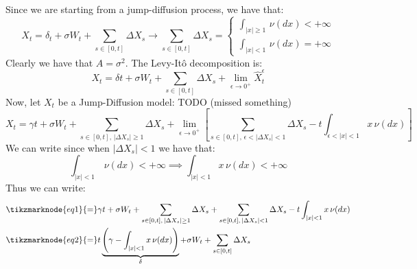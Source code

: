 \begin{example}
Since we are starting from a jump-diffusion process, we have that:
\[
    X_t = \delta_t + \sigma W_t + \sum_{s\in[0,t]} \Delta X_s \longrightarrow
   \sum_{s\in[0,t]} \Delta X_s = \left\{\begin{array}{l}\int_{|x|\geq1}\,\nu(dx)
    < +\infty \\ \int_{|x|<1} \, \nu(dx) = +\infty \end{array}\right.
\]
Clearly we have that $A = \sigma^2$. The Levy-Itô decomposition is:
\[
    X_t = \delta t + \sigma W_t + \sum_{s\in[0,t]} \Delta X_s + \lim_{
    \epsilon \to 0^+} \hat{X}^\epsilon_t
\]
Now, let $X_t$ be a Jump-Diffusion model: TODO (missed something)
\[ X_t = \gamma t + \sigma W_t + \sum_{s\in[0,t], \, |\Delta X_s| \geq 1} \Delta
    X_s + \lim_{\epsilon \to 0^+} \left[ \sum_{s\in[0,t], \, \epsilon < |\Delta
    X_s| < 1} \Delta X_s - t \int_{\epsilon < |x| < 1} x \, \nu(dx) \right]
\]
We can write since when $|\Delta X_s| < 1$ we have that:
\[ \int_{|x|<1} \,\nu(dx) < +\infty \implies \int_{|x|<1} x\,\nu(dx)<+\infty \]
Thus we can write:
\begin{align*}
    & \tikzmarknode{eq1}{=} \gamma t + \sigma W_t + \sum_{s\in[0,t], \, |\Delta
    X_s| \geq 1} \Delta X_s + \sum_{s\in[0,t], \, |\Delta X_s| < 1} \Delta X_s
    - t \int_{|x|<1} x \,\nu(dx) \\
    & \tikzmarknode{eq2}{=} t \underbrace{\left( \gamma -\int_{|x|<1}x \,\nu(dx)
    \right)}_{\delta} + \sigma W_t + \sum_{s\in[0,t]} \Delta X_s
\end{align*} 
\end{example}

